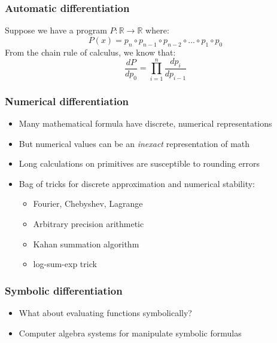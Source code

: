 \documentclass{beamer}
\begin{document}

        \begin{frame}
        \frametitle{Automatic differentiation}
        Suppose we have a program $P: \mathbb{R}\rightarrow\mathbb{R}$ where:
        \begin{equation}
            P(x)=p_n \circ p_{n-1} \circ p_{n-2} \circ ... \circ p_1 \circ p_0
        \end{equation}
        From the chain rule of calculus, we know that:
        \begin{equation}
            \frac{dP}{dp_0} = {\displaystyle \prod_{i=1}^{n} \frac{dp_{i}}{dp_{i-1}}}
        \end{equation}
    \end{frame}



    \begin{frame}
        \frametitle{Numerical differentiation}
        \begin{itemize}
            \item Many mathematical formula have discrete, numerical representations
            \item But numerical values can be an \textit{inexact} representation of math
            \item Long calculations on primitives are susceptible to rounding errors
            \item Bag of tricks for discrete approximation and numerical stability:
            \begin{itemize}
                \item Fourier, Chebyshev, Lagrange
                \item Arbitrary precision arithmetic
                \item Kahan summation algorithm
                \item log-sum-exp trick
            \end{itemize}
        \end{itemize}
    \end{frame}


    \begin{frame}
        \frametitle{Symbolic differentiation}
        \begin{itemize}
            \item What about evaluating functions symbolically?
            \item Computer algebra systems for manipulate symbolic formulas
        \end{itemize}
    \end{frame}
\end{document}
